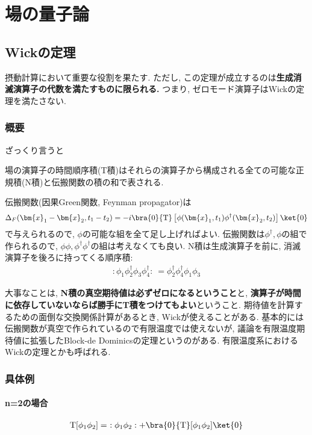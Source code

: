 
\chapter{場の量子論}
\section{Wickの定理}
摂動計算において重要な役割を果たす. ただし, この定理が成立するのは\textbf{生成消滅演算子の代数を満たすものに限られる. }つまり, ゼロモード演算子はWickの定理を満たさない. 
\subsection{概要}
ざっくり言うと
\begin{screen}
  場の演算子の時間順序積(T積)はそれらの演算子から構成される全ての可能な正規積(N積)と伝搬関数の積の和で表される.
\end{screen}
伝搬関数(因果Green関数, Feynman propagator)は
\begin{eqnarray}
  \Delta_F(\bm{x}_1-\bm{x}_2, t_1-t_2) = -i\bra{0}{\rm T}\left[\phi(\bm{x}_1, t_1)\phi^\dagger(\bm{x}_2, t_2)\right]\ket{0}
\end{eqnarray}
で与えられるので, $\phi$の可能な組を全て足し上げればよい. 伝搬関数は$\phi^\dagger, \phi$の組で作られるので, $\phi\phi, \phi^\dagger\phi^\dagger$の組は考えなくても良い. 
N積は生成演算子を前に, 消滅演算子を後ろに持ってくる順序積:
\begin{eqnarray}
  :\phi_1\phi^\dagger_2\phi_3\phi^\dagger_4:\ = \phi^\dagger_2\phi^\dagger_4\phi_1\phi_3
\end{eqnarray}

大事なことは, \textbf{N積の真空期待値は必ずゼロになるということ}と, \textbf{演算子が時間に依存していないならば勝手にT積をつけてもよい}ということ. 期待値を計算するための面倒な交換関係計算があるとき, Wickが使えることがある. 基本的には伝搬関数が真空で作られているので有限温度では使えないが, 議論を有限温度期待値に拡張したBlock-de Dominicsの定理というのがある. 有限温度系におけるWickの定理とかも呼ばれる. 
\subsection{具体例}
\subsubsection{n=2の場合}
\begin{eqnarray}
  {\rm T}[\phi_1\phi_2] =\ :\phi_1\phi_2: + \bra{0}{\rm T}[\phi_1\phi_2]\ket{0}
\end{eqnarray}
